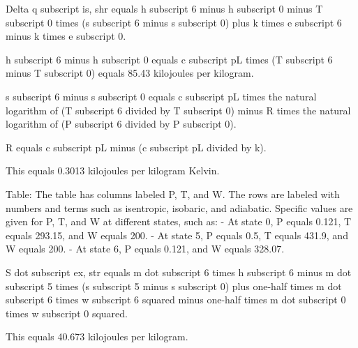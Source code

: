 Delta q subscript is, shr equals h subscript 6 minus h subscript 0 minus T subscript 0 times (s subscript 6 minus s subscript 0) plus k times e subscript 6 minus k times e subscript 0.

h subscript 6 minus h subscript 0 equals c subscript pL times (T subscript 6 minus T subscript 0) equals 85.43 kilojoules per kilogram.

s subscript 6 minus s subscript 0 equals c subscript pL times the natural logarithm of (T subscript 6 divided by T subscript 0) minus R times the natural logarithm of (P subscript 6 divided by P subscript 0).

R equals c subscript pL minus (c subscript pL divided by k).

This equals 0.3013 kilojoules per kilogram Kelvin.

Table:
The table has columns labeled P, T, and W. The rows are labeled with numbers and terms such as isentropic, isobaric, and adiabatic. Specific values are given for P, T, and W at different states, such as:
- At state 0, P equals 0.121, T equals 293.15, and W equals 200.
- At state 5, P equals 0.5, T equals 431.9, and W equals 200.
- At state 6, P equals 0.121, and W equals 328.07.

S dot subscript ex, str equals m dot subscript 6 times h subscript 6 minus m dot subscript 5 times (s subscript 5 minus s subscript 0) plus one-half times m dot subscript 6 times w subscript 6 squared minus one-half times m dot subscript 0 times w subscript 0 squared.

This equals 40.673 kilojoules per kilogram.